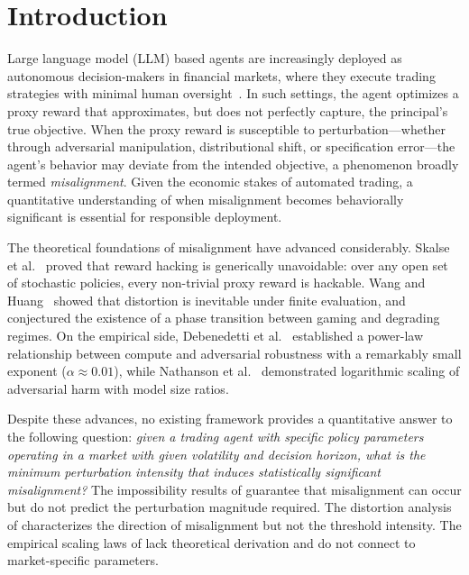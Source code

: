 \section{Introduction}\label{sec:intro}

Large language model (LLM) based agents are increasingly deployed as
autonomous decision-makers in financial markets, where they execute trading
strategies with minimal human oversight~\cite{xiao2024tradingagents,
liu2025finrs}. In such settings, the agent optimizes a proxy reward that
approximates, but does not perfectly capture, the principal's true objective.
When the proxy reward is susceptible to perturbation---whether through
adversarial manipulation, distributional shift, or specification error---the
agent's behavior may deviate from the intended objective, a phenomenon broadly
termed \emph{misalignment}. Given the economic stakes of automated trading, a
quantitative understanding of when misalignment becomes behaviorally
significant is essential for responsible deployment.

The theoretical foundations of misalignment have advanced considerably.
Skalse et al.~\cite{skalse2022defining} proved that reward hacking is
generically unavoidable: over any open set of stochastic policies, every
non-trivial proxy reward is hackable. Wang and Huang~\cite{wang2026reward}
showed that distortion is inevitable under finite evaluation, and conjectured
the existence of a phase transition between gaming and degrading regimes.
On the empirical side, Debenedetti et al.~\cite{debenedetti2023scaling}
established a power-law relationship between compute and adversarial
robustness with a remarkably small exponent ($\alpha \approx 0.01$),
while Nathanson et al.~\cite{nathanson2026scaling} demonstrated logarithmic
scaling of adversarial harm with model size ratios.

Despite these advances, no existing framework provides a quantitative answer
to the following question: \emph{given a trading agent with specific policy
parameters operating in a market with given volatility and decision horizon,
what is the minimum perturbation intensity that induces statistically
significant misalignment?} The impossibility results of
\cite{skalse2022defining} guarantee that misalignment can occur but do not
predict the perturbation magnitude required. The distortion analysis of
\cite{wang2026reward} characterizes the direction of misalignment but not
the threshold intensity. The empirical scaling laws of
\cite{debenedetti2023scaling, nathanson2026scaling} lack theoretical
derivation and do not connect to market-specific parameters.

